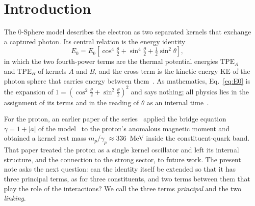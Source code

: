\documentclass[%
 reprint, amsmath,amssymb, aps, prb, ]{revtex4-2}
\numberwithin{equation}{section}
\begin{document}
\maketitle

\section{Introduction}
\label{sec:intro}

The 0-Sphere model describes the electron as two separated kernels that exchange a captured photon. Its central relation is the energy identity~\cite{ref:p1}
\begin{equation}
E_0=E_0\left[\cos^4\tfrac{\theta}{2}+\sin^4\tfrac{\theta}{2}+\tfrac12\sin^2\theta\right],
\label{eq:E0}
\end{equation}
in which the two fourth-power terms are the thermal potential energies $\mathrm{TPE}_A$ and $\mathrm{TPE}_B$ of kernels $A$ and $B$, and the cross term is the kinetic energy $\mathrm{KE}$ of the photon sphere that carries energy between them~\cite{ref:p10,ref:p65}. As mathematics, Eq.~\eqref{eq:E0} is the expansion of $1=(\cos^2\frac{\theta}{2}+\sin^2\frac{\theta}{2})^2$ and says nothing; all physics lies in the assignment of its terms and in the reading of $\theta$ as an internal time~\cite{ref:trunks}.

For the proton, an earlier paper of the series~\cite{ref:p61} applied the bridge equation $\gamma=1+|a|$ of the model~\cite{ref:p10,ref:p62} to the proton's anomalous magnetic moment and obtained a kernel rest mass $m_p/\gamma_p\approx336$~MeV inside the constituent-quark band. That paper treated the proton as a single kernel oscillator and left its internal structure, and the connection to the strong sector, to future work. The present note asks the next question: can the identity itself be extended so that it has three principal terms, as for three constituents, and two terms between them that play the role of the interactions? We call the three terms \emph{principal} and the two \emph{linking}.
\end{document}
